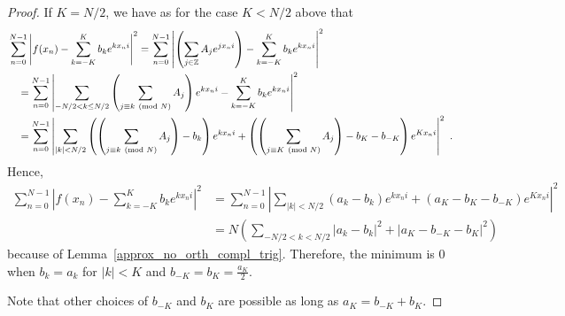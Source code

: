 \begin{proof}
 If $K=N/2$, we have as for the case $K<N/2$ above that
\begin{align*}
&\sum_{n=0}^{N-1} \left| f(x_n) - \sum_{k=-K}^K b_k e^{k x_n i} \right|^2 =
\sum_{n=0}^{N-1} \left| \left(\sum_{j\in\mathbb{Z}} A_j e^{j x_n i} \right)
- \sum_{k=-K}^K b_k e^{k x_n i} \right|^2 \\
&\quad =\sum_{n=0}^{N-1} \left| \sum_{-N/2<k\leq N/2}
\left( \sum_{j\equiv k \pmod{N}} A_j \right) e^{k x_n i} - \sum_{k=-K}^K b_k
e^{k x_n i} \right|^2 \\
&\quad = \sum_{n=0}^{N-1} \left| \sum_{|k|<N/2}
\left( \left(\sum_{j\equiv k \pmod{N}} A_j\right) - b_k \right) e^{k x_n i} 
+ \left(\left(\sum_{j\equiv K \pmod{N}} A_j\right) - b_K - b_{-K}\right)
e^{Kx_n i} \right|^2 \ .
\end{align*}
Hence,
\begin{align*}
\sum_{n=0}^{N-1} \left| f(x_n) - \sum_{k=-K}^K b_k e^{k x_n i} \right|^2 &=
\sum_{n=0}^{N-1} \left| \sum_{|k|<N/2}
\left( a_k - b_k \right) e^{k x_n i} +\left(a_K - b_K - b_{-K}\right)
e^{Kx_n i}\right|^2\\
&= N \left( \sum_{-N/2<k <N/2} \left|a_k - b_k \right|^2 +
\left|a_K - b_{-K}-b_K \right|^2 \right)
\end{align*}
because of Lemma~\ref{approx_no_orth_compl_trig}.
Therefore, the minimum is $0$ when
$b_k=a_k$ for $|k| < K$ and $\displaystyle b_{-K}=b_K = \frac{a_K}{2}$.

Note that other choices of $b_{-K}$ and $b_K$ are possible as long as
$a_K = b_{-K} +b_K$.
\end{proof}


